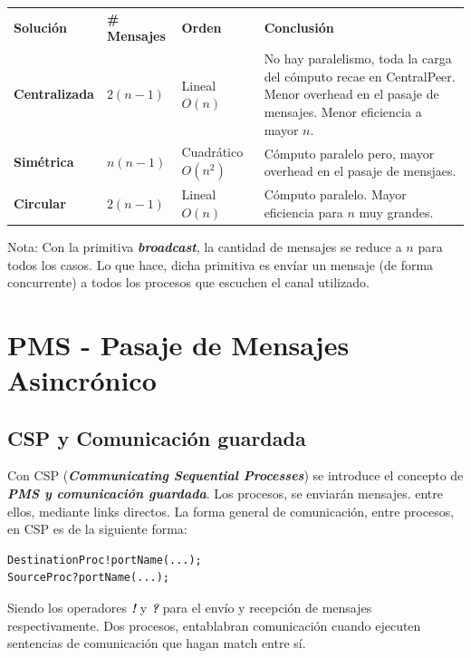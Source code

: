 \documentclass[a4paper, 10pt]{report}
\begin{document}
{\renewcommand{\arraystretch}{2}%
\begin{center}
\begin{tabular}{p{2.5cm} p{3cm} p{1.8cm} p{7.5cm} }
\textbf{Solución} &  \textbf{\# Mensajes} & \textbf{Orden} & \textbf{Conclusión} \\
\textbf{Centralizada} & $2(n-1)$ & Lineal \newline $O(n)$ & No hay paralelismo, toda la carga del cómputo recae en CentralPeer. Menor overhead en el pasaje de mensajes. Menor eficiencia a mayor $n$. \\
\hline
\textbf{Simétrica} & $n(n-1)$&  Cuadrático \newline $O(n^2)$& Cómputo paralelo pero, mayor overhead en el pasaje de mensjaes.\\
\hline
\textbf{Circular} &  $2(n-1)$& Lineal \newline $O(n)$ & Cómputo paralelo. Mayor eficiencia para $n$ muy grandes.
\end{tabular}
\end{center}}

Nota: Con la primitiva \textbf{\emph{broadcast}}, la cantidad de mensajes se reduce a $n$ para todos los casos. Lo que hace, dicha primitiva es envíar un mensaje (de forma concurrente) a todos los procesos que escuchen el canal utilizado.

\chapter{PMS - Pasaje de Mensajes Asincrónico}

\section{CSP y Comunicación guardada}

Con CSP (\textbf{\emph{Communicating Sequential Processes}}) se introduce el concepto de \textbf{\emph{PMS y comunicación guardada}}. Los procesos, se enviarán mensajes. entre ellos, mediante links directos. La forma general de comunicación, entre procesos, en CSP es de la siguiente forma:

\begin{lstlisting}
DestinationProc!portName(...);
SourceProc?portName(...);
\end{lstlisting}

Siendo los operadores \textbf{\emph{!}} y \textbf{\emph{?}} para el envío y recepción de mensajes respectivamente. Dos procesos, entablabran comunicación cuando ejecuten sentencias de comunicación que hagan match entre sí. 
\end{document}
